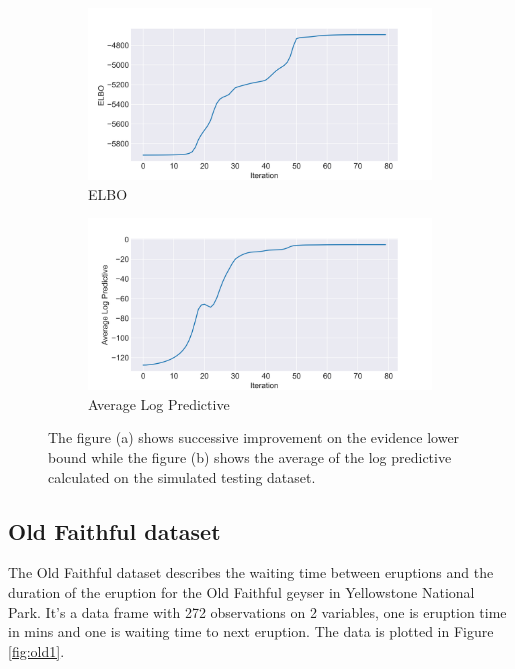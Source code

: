 \documentclass[letterpaper]{article}
\begin{document}
\begin{figure}[H]
  \centering
  \begin{subfigure}[b]{0.45\linewidth}
    \includegraphics[width=\linewidth]{outputs/simulation/elbo.png}
     \caption{ELBO}
  \end{subfigure}
  \begin{subfigure}[b]{0.45\linewidth}
    \includegraphics[width=\linewidth]{outputs/simulation/pred_density.png}
    \caption{Average Log Predictive}
  \end{subfigure}
  \caption{The figure (a) shows successive improvement on the evidence lower bound while the figure (b) shows the average of the log predictive calculated on the simulated testing dataset.}
\end{figure}

\subsection{Old Faithful dataset}

The Old Faithful dataset describes the waiting time between eruptions and the duration of the eruption for the Old Faithful geyser in Yellowstone National Park. It's a data frame with 272 observations on 2 variables, one is eruption time in mins and one is waiting time to next eruption. The data is plotted in Figure \ref{fig:old1}.
\end{document}

